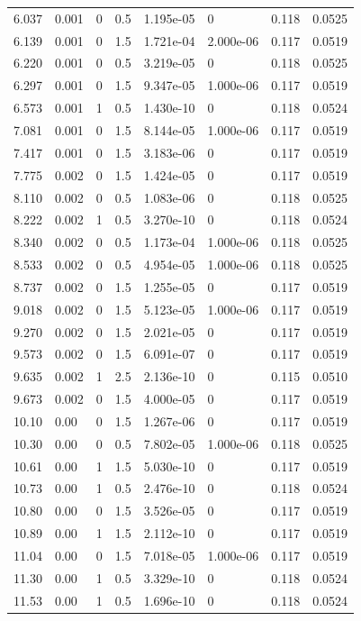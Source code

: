 \documentclass[preview]{standalone}
\begin{document}
{{\begin{tabular}{L{1.2cm}C{1.2cm} C{0.3cm}C{0.5cm} C{1.4cm}C{1.4cm} C{1.4cm}C{1.4cm}}
  6.037  &  0.001  & 0     & 0.5 &  1.195e-05  & 0  & 0.118 &  0.0525   \\ 
  6.139  &  0.001  & 0     & 1.5 &  1.721e-04  & 2.000e-06  & 0.117 &  0.0519   \\ 
  6.220  &  0.001  & 0     & 0.5 &  3.219e-05  & 0  & 0.118 &  0.0525   \\ 
  6.297  &  0.001  & 0     & 1.5 &  9.347e-05  & 1.000e-06  & 0.117 &  0.0519   \\ 
  6.573  &  0.001  & 1     & 0.5 &  1.430e-10  & 0  & 0.118 &  0.0524   \\ 
  7.081  &  0.001  & 0     & 1.5 &  8.144e-05  & 1.000e-06  & 0.117 &  0.0519   \\ 
  7.417  &  0.001  & 0     & 1.5 &  3.183e-06  & 0  & 0.117 &  0.0519   \\ 
  7.775  &  0.002  & 0     & 1.5 &  1.424e-05  & 0  & 0.117 &  0.0519   \\ 
  8.110  &  0.002  & 0     & 0.5 &  1.083e-06  & 0  & 0.118 &  0.0525   \\ 
  8.222  &  0.002  & 1     & 0.5 &  3.270e-10  & 0  & 0.118 &  0.0524   \\ 
  8.340  &  0.002  & 0     & 0.5 &  1.173e-04  & 1.000e-06  & 0.118 &  0.0525   \\ 
  8.533  &  0.002  & 0     & 0.5 &  4.954e-05  & 1.000e-06  & 0.118 &  0.0525   \\ 
  8.737  &  0.002  & 0     & 1.5 &  1.255e-05  & 0  & 0.117 &  0.0519   \\ 
  9.018  &  0.002  & 0     & 1.5 &  5.123e-05  & 1.000e-06  & 0.117 &  0.0519   \\ 
  9.270  &  0.002  & 0     & 1.5 &  2.021e-05  & 0  & 0.117 &  0.0519   \\ 
  9.573  &  0.002  & 0     & 1.5 &  6.091e-07  & 0  & 0.117 &  0.0519   \\ 
  9.635  &  0.002  & 1     & 2.5 &  2.136e-10  & 0  & 0.115 &  0.0510   \\ 
  9.673  &  0.002  & 0     & 1.5 &  4.000e-05  & 0  & 0.117 &  0.0519   \\ 
  10.10  &  0.00  & 0     & 1.5 &  1.267e-06  & 0  & 0.117 &  0.0519   \\ 
  10.30  &  0.00  & 0     & 0.5 &  7.802e-05  & 1.000e-06  & 0.118 &  0.0525   \\ 
  10.61  &  0.00  & 1     & 1.5 &  5.030e-10  & 0  & 0.117 &  0.0519   \\ 
  10.73  &  0.00  & 1     & 0.5 &  2.476e-10  & 0  & 0.118 &  0.0524   \\ 
  10.80  &  0.00  & 0     & 1.5 &  3.526e-05  & 0  & 0.117 &  0.0519   \\ 
  10.89  &  0.00  & 1     & 1.5 &  2.112e-10  & 0  & 0.117 &  0.0519   \\ 
  11.04  &  0.00  & 0     & 1.5 &  7.018e-05  & 1.000e-06  & 0.117 &  0.0519   \\ 
  11.30  &  0.00  & 1     & 0.5 &  3.329e-10  & 0  & 0.118 &  0.0524   \\ 
  11.53  &  0.00  & 1     & 0.5 &  1.696e-10  & 0  & 0.118 &  0.0524   \\ 
\hline 
\end{tabular} 

}}
\end{document}
